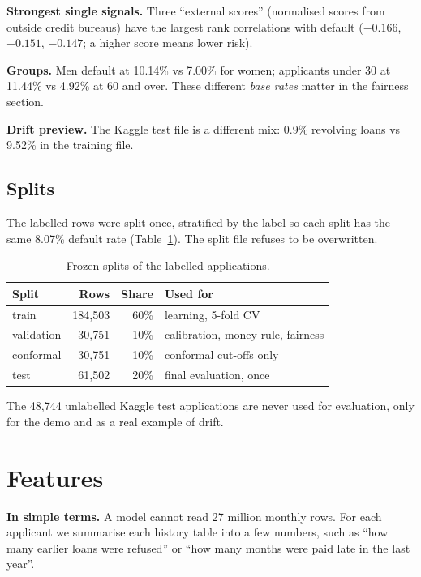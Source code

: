\documentclass[conference,10pt]{IEEEtran}
\newcommand{\simple}[1]{\par\smallskip\noindent\colorbox{gray!13}{\parbox{\dimexpr\columnwidth-2\fboxsep\relax}{\small\textbf{In simple terms.} #1}}\par\smallskip}
\begin{document}
\textbf{Strongest single signals.} Three ``external scores'' (normalised scores from outside
credit bureaus) have the largest rank correlations with default ($-0.166$, $-0.151$,
$-0.147$; a higher score means lower risk).

\textbf{Groups.} Men default at 10.14\% vs 7.00\% for women; applicants under 30 at 11.44\% vs
4.92\% at 60 and over. These different \emph{base rates} matter in the fairness section.

\textbf{Drift preview.} The Kaggle test file is a different mix: 0.9\% revolving loans vs 9.52\%
in the training file.

\subsection{Splits}
The labelled rows were split once, stratified by the label so each split has the same 8.07\%
default rate (Table~\ref{tab:splits}). The split file refuses to be overwritten.

\begin{table}[h]
\centering\small
\caption{Frozen splits of the labelled applications.}
\label{tab:splits}
\setlength{\tabcolsep}{4pt}
\begin{tabular}{@{}lrrl@{}}
\toprule
Split & Rows & Share & Used for \\
\midrule
train & 184,503 & 60\% & learning, 5-fold CV \\
validation & 30,751 & 10\% & calibration, money rule, fairness \\
conformal & 30,751 & 10\% & conformal cut-offs only \\
test & 61,502 & 20\% & final evaluation, once \\
\bottomrule
\end{tabular}
\end{table}

The 48,744 unlabelled Kaggle test applications are never used for evaluation, only for the demo
and as a real example of drift.

\section{Features}
\label{sec:features}
\simple{A model cannot read 27 million monthly rows. For each applicant we summarise each
history table into a few numbers, such as ``how many earlier loans were refused'' or ``how many
months were paid late in the last year''.}
\end{document}
